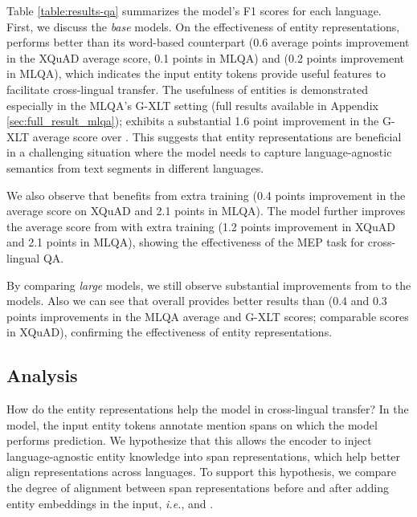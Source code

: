 \documentclass[11pt]{article}
\newcommand{\minisection}[1]{\noindent{\bf {#1}.}}
\newcommand{\Appendix}[1]{Appendix \ref{#1}}
\begin{document}
\minisection{Results}
Table \ref{table:results-qa} summarizes the model's F1 scores for each language.
First, we discuss the {\it base} models.
On the effectiveness of entity representations, \mlukeE{}\ba{} performs better than its word-based counterpart \mlukeW{}\ba{} (0.6 average points improvement in the XQuAD average score, 0.1 points in MLQA) and \xlmk{} (0.2 points improvement in MLQA), which indicates the input entity tokens provide useful features to facilitate cross-lingual transfer.
The usefulness of entities is demonstrated especially in the MLQA's G-XLT setting (full results available in \Appendix{sec:full_result_mlqa});
\mlukeE{}\ba{} exhibits a substantial 1.6 point improvement in the G-XLT average score over \mlukeW{}\ba{}.
This suggests that entity representations are beneficial in a challenging situation where the model needs to capture language-agnostic semantics from text segments in different languages.

We also observe that \xlmr{}\ba{} benefits from extra training (0.4 points improvement in the average score on XQuAD and 2.1 points in MLQA).
The \mlukeW{}\ba{} model further improves the average score from \xlmr{}\ba{} with extra training (1.2 points improvement in XQuAD and 2.1 points in MLQA), showing the effectiveness of the MEP task for cross-lingual QA.

By comparing {\it large} models, we still observe substantial improvements from \xlmr{}\la{} to the \mluke{} models.
Also we can see that \mlukeE{}\la{} overall provides better results than \mlukeW{}\la{} (0.4 and 0.3 points improvements in the MLQA average and G-XLT scores; comparable scores in XQuAD), confirming the effectiveness of entity representations.


\subsection{Analysis}
\label{subsec:qa_analysis}

How do the entity representations help the model in cross-lingual transfer?
In the \mlukeE{} model, the input entity tokens annotate mention spans on which the model performs prediction.
We hypothesize that this allows the encoder to inject language-agnostic entity knowledge into span representations, which help better align representations across languages.
To support this hypothesis, we compare the degree of alignment between span representations before and after adding entity embeddings in the input, {\it i.e.}, \mlukeW{} and \mlukeE{}.
\end{document}
